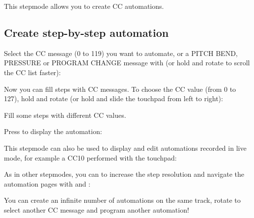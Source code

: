This stepmode allows you to create CC automations.

\subsection{Create step-by-step automation}

Select the CC message (0 to 119) you want to automate, or a PITCH BEND, PRESSURE or PROGRAM CHANGE message with \encodericon{} (or hold  and rotate \encodericon{} to scroll the CC list faster):



Now you can fill steps with CC messages. To choose the CC value (from 0 to 127), hold  and rotate \encodericon{} (or hold  and slide the touchpad from left to right):



Fill some steps with different CC values.

Press  to display the automation:




This stepmode can also be used to display and edit automations recorded in live mode, for example a CC10 performed with the touchpad:



As in other stepmodes, you can  to increase the step resolution and navigate the automation pages with \btn{<} and \btn{>}:



You can create an infinite number of automations on the same track, rotate \encodericon{} to select another CC message and program another automation!

